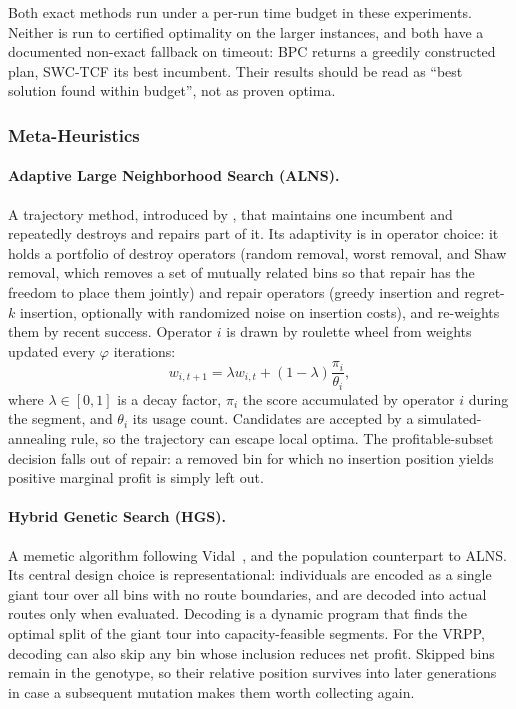 \documentclass[orivec,runningheads]{llncs}
\begin{document}
Both exact methods run under a per-run time budget in these experiments. Neither
is run to certified optimality on the larger instances, and both have a
documented non-exact fallback on timeout: BPC returns a greedily constructed
plan, SWC-TCF its best incumbent. Their results should be read as ``best
solution found within budget'', not as proven optima.

\subsubsection{Meta-Heuristics}

\paragraph{Adaptive Large Neighborhood Search (ALNS).}
A trajectory method, introduced by \cite{f386d3b9a20d4a43a28a2d07aed60460}, that maintains one incumbent and repeatedly destroys and
repairs part of it. Its adaptivity is in operator choice: it holds a portfolio of
destroy operators (random removal, worst removal, and Shaw removal, which
removes a set of mutually related bins so that repair has the freedom to place
them jointly) and repair operators (greedy insertion and regret-$k$ insertion,
optionally with randomized noise on insertion costs), and re-weights them by recent success. Operator $i$ is drawn by roulette wheel from weights updated
every $\varphi$ iterations:
\begin{equation}
    w_{i,t+1} = \lambda w_{i,t} + (1-\lambda)\frac{\pi_i}{\theta_i},
\end{equation}
where $\lambda \in [0,1]$ is a decay factor, $\pi_i$ the score accumulated by
operator $i$ during the segment, and $\theta_i$ its usage count. Candidates are
accepted by a simulated-annealing rule, so the trajectory can escape local
optima. The profitable-subset decision falls out of repair: a removed bin for
which no insertion position yields positive marginal profit is simply left out.

\paragraph{Hybrid Genetic Search (HGS).}
A memetic algorithm following Vidal~\cite{VIDAL2022105643}, and the population
counterpart to ALNS. Its central design choice is representational: individuals
are encoded as a single giant tour over all bins with no route boundaries, and
are decoded into actual routes only when evaluated. Decoding is a dynamic
program that finds the optimal split of the giant tour into capacity-feasible
segments. For the VRPP, decoding can also skip any bin whose inclusion reduces net
profit. Skipped bins remain in the genotype, so their relative position survives
into later generations in case a subsequent mutation makes them worth collecting
again.
\end{document}

